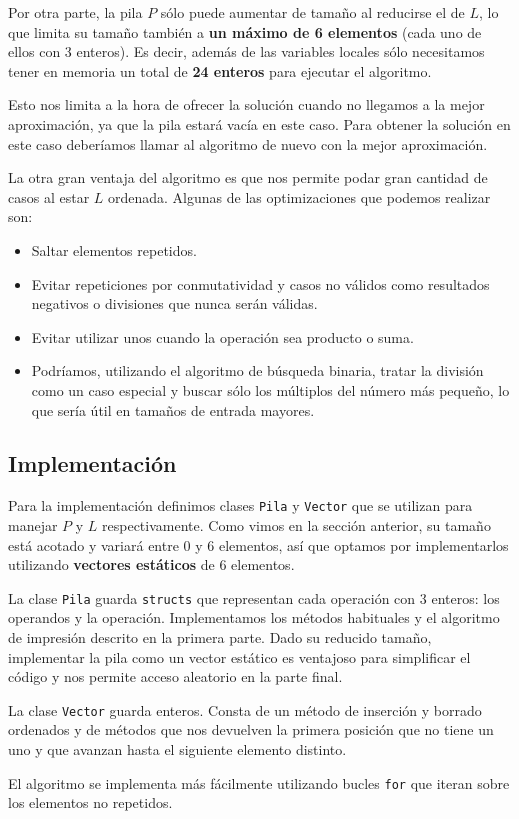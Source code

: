 Por otra parte, la pila $P$ sólo puede aumentar de tamaño al
reducirse el de $L$, lo que limita su tamaño también a
\textbf{un máximo de 6 elementos} (cada uno de ellos con 3
enteros). Es decir, además de las variables locales sólo
necesitamos tener en memoria un total de \textbf{24 enteros}
para ejecutar el algoritmo.

Esto nos limita a la hora de ofrecer la solución cuando no llegamos
a la mejor aproximación, ya que la pila estará vacía en este
caso. Para obtener la solución en este caso deberíamos llamar
al algoritmo de nuevo con la mejor aproximación.

La otra gran ventaja del algoritmo es que nos permite podar gran
cantidad de casos al estar $L$ ordenada. Algunas de las optimizaciones
que podemos realizar son:

\begin{itemize}
	\item Saltar elementos repetidos.
	\item Evitar repeticiones por conmutatividad y casos no válidos
	como resultados negativos o divisiones que nunca serán válidas.
	\item Evitar utilizar unos cuando la operación sea producto o suma.
	\item Podríamos, utilizando el algoritmo de búsqueda binaria,
	tratar la división como un caso especial y buscar sólo los múltiplos
	del número más pequeño, lo que sería útil en tamaños de entrada mayores.
\end{itemize}

\subsection{Implementación}

Para la implementación definimos clases \texttt{Pila} y \texttt{Vector} que
se utilizan para manejar $P$ y $L$ respectivamente. Como vimos en la sección
anterior, su tamaño está acotado y variará entre 0 y 6 elementos, así que
optamos por implementarlos utilizando \textbf{vectores estáticos} de 6 elementos.

La clase \texttt{Pila} guarda \texttt{structs} que representan cada operación
con 3 enteros: los operandos y la operación. Implementamos los métodos habituales
y el algoritmo de impresión descrito en la primera parte. Dado su reducido tamaño,
implementar la pila como un vector estático es ventajoso para simplificar el código
y nos permite acceso aleatorio en la parte final.

La clase \texttt{Vector} guarda enteros. Consta de un método de inserción y borrado
ordenados y de métodos que nos devuelven la primera posición que no tiene un uno
y que avanzan hasta el siguiente elemento distinto.

El algoritmo se implementa más fácilmente utilizando bucles \texttt{for} que iteran
sobre los elementos no repetidos.
